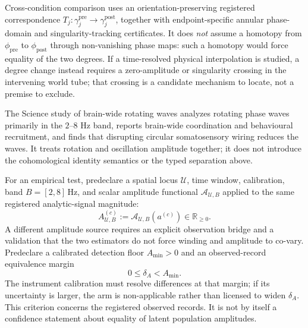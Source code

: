 \documentclass[11pt]{article}
\theoremstyle{definition}
\begin{document}
Cross-condition comparison uses an orientation-preserving registered
correspondence \(T_j:\gamma_j^{\mathrm{pre}}\to
\gamma_j^{\mathrm{post}}\), together with endpoint-specific annular
phase-domain and singularity-tracking certificates.  It does \emph{not}
assume a homotopy from \(\phi_{\mathrm{pre}}\) to
\(\phi_{\mathrm{post}}\) through non-vanishing phase maps: such a homotopy
would force equality of the two degrees.  If a time-resolved physical
interpolation is studied, a degree change instead requires a zero-amplitude
or singularity crossing in the intervening world tube; that crossing is a
candidate mechanism to locate, not a premise to exclude.

The Science study of brain-wide rotating waves \cite{ye} analyzes
rotating phase waves primarily in the \(2\text{--}8\) Hz band, reports
brain-wide coordination and behavioural recruitment, and finds that
disrupting circular somatosensory wiring reduces the waves.  It treats
rotation and oscillation amplitude together; it does not introduce the
cohomological identity semantics or the typed separation above.

For an empirical test, predeclare a spatial locus \(\mathcal U\), time
window, calibration, band \(B=[2,8]\,\mathrm{Hz}\), and scalar amplitude
functional \(\mathcal A_{\mathcal U,B}\) applied to the same registered
analytic-signal magnitude:
\[
A_{\mathcal U,B}^{(c)}
  :=\mathcal A_{\mathcal U,B}\!\left(a^{(c)}\right)
  \in\mathbb R_{\ge0}.
\]
A different amplitude source requires an explicit observation bridge and
a validation that the two estimators do not force winding and amplitude to
co-vary.  Predeclare a calibrated detection floor \(A_{\min}>0\) and an
observed-record equivalence margin
\[
0\le\delta_A<A_{\min}.
\]
The instrument calibration must resolve differences at that margin; if its
uncertainty is larger, the arm is non-applicable rather than licensed to
widen \(\delta_A\).  This criterion concerns the registered observed
records.  It is not by itself a confidence statement about equality of
latent population amplitudes.
\end{document}
